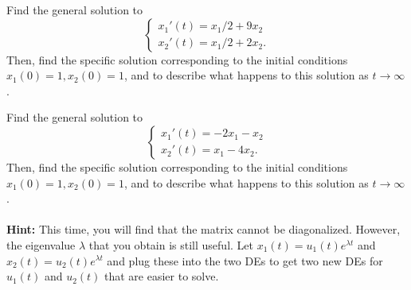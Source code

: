 \documentclass[12pt,letterpaper]{hmcpset}
\begin{document}
\begin{problem}[4]
    Find the general solution to
    \[
        \begin{cases}
            x_1'(t)=x_1/2+9x_2\\
            x_2'(t)=x_1/2+2x_2.
        \end{cases}
    \]
    Then, find the specific solution corresponding to the initial
    conditions $x_1(0)=1,x_2(0)=1$, and to describe what happens to
    this solution as $t\to\infty$.
\end{problem}
\begin{solution}
    \vfill
\end{solution}
\newpage

\begin{problem}[5]
    Find the general solution to
    \[
        \begin{cases}
            x_1'(t)=-2x_1-x_2\\
            x_2'(t)=x_1-4x_2.
        \end{cases}
    \]
    Then, find the specific solution corresponding to the initial
    conditions $x_1(0)=1,x_2(0)=1$, and to describe what happens to
    this solution as $t\to\infty$.\\\\
    \textbf{Hint:} This time, you will find that the matrix cannot be
    diagonalized. However, the eigenvalue $\lambda$ that you obtain is
    still useful. Let $x_1(t)=u_1(t)e^{\lambda t}$ and
    $x_2(t)=u_2(t)e^{\lambda t}$ and plug these into the two DEs to
    get two new DEs for $u_1(t)$ and $u_2(t)$ that are easier to
    solve.
\end{problem}
\begin{solution}
    \vfill
\end{solution}
\end{document}
